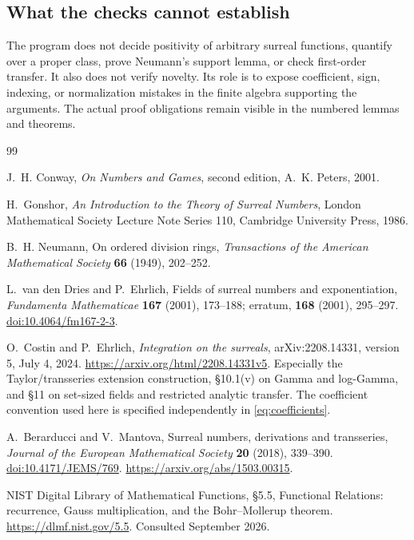 \documentclass[11pt,letterpaper]{article}
\numberwithin{equation}{section}
\theoremstyle{plain}
\theoremstyle{definition}
\theoremstyle{remark}
\begin{document}
\subsection{What the checks cannot establish}
The program does not decide positivity of arbitrary surreal functions,
quantify over a proper class, prove Neumann's support lemma, or check
first-order transfer. It also does not verify novelty. Its role is to expose
coefficient, sign, indexing, or normalization mistakes in the finite algebra
supporting the arguments. The actual proof obligations remain visible in
the numbered lemmas and theorems.

\begin{thebibliography}{99}

J.~H. Conway,
\emph{On Numbers and Games}, second edition,
A.~K. Peters, 2001.

H.~Gonshor,
\emph{An Introduction to the Theory of Surreal Numbers},
London Mathematical Society Lecture Note Series 110,
Cambridge University Press, 1986.

B.~H. Neumann,
On ordered division rings,
\emph{Transactions of the American Mathematical Society}
\textbf{66} (1949), 202--252.

L.~van den Dries and P.~Ehrlich,
Fields of surreal numbers and exponentiation,
\emph{Fundamenta Mathematicae} \textbf{167} (2001), 173--188;
erratum, \textbf{168} (2001), 295--297.
\href{https://doi.org/10.4064/fm167-2-3}{doi:10.4064/fm167-2-3}.

O.~Costin and P.~Ehrlich,
\emph{Integration on the surreals},
arXiv:2208.14331, version 5, July 4, 2024.
\url{https://arxiv.org/html/2208.14331v5}.
Especially the Taylor/transseries extension construction, \S10.1(v) on
Gamma and log-Gamma, and \S11 on set-sized fields and restricted analytic
transfer. The coefficient convention used here is specified independently
in \eqref{eq:coefficients}.

A.~Berarducci and V.~Mantova,
Surreal numbers, derivations and transseries,
\emph{Journal of the European Mathematical Society}
\textbf{20} (2018), 339--390.
\href{https://doi.org/10.4171/JEMS/769}{doi:10.4171/JEMS/769}.
\url{https://arxiv.org/abs/1503.00315}.

NIST Digital Library of Mathematical Functions,
\S5.5, Functional Relations: recurrence, Gauss multiplication, and the
Bohr--Mollerup theorem.
\url{https://dlmf.nist.gov/5.5}.
Consulted September 2026.


\end{thebibliography}
\end{document}
